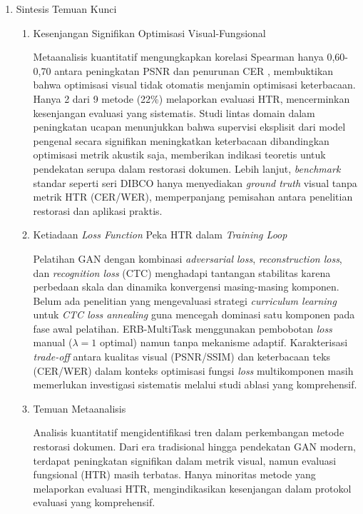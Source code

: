 \documentclass[12pt,a4paper]{article}
\begin{document}
\begin{enumerate}[leftmargin=*, labelindent=0pt, itemsep=1ex, topsep=0pt]

\item Sintesis Temuan Kunci

\begin{enumerate}[leftmargin=1.5em, labelsep=0.5em, itemindent=0pt, label=\alph*., topsep=0pt, parsep=0pt, itemsep=0pt]
      \item Kesenjangan Signifikan Optimisasi Visual-Fungsional

            Metaanalisis kuantitatif mengungkapkan korelasi Spearman hanya 0,60-0,70 antara peningkatan PSNR dan penurunan CER \parencite{jadhav2022}, membuktikan bahwa optimisasi visual tidak otomatis menjamin optimisasi keterbacaan. Hanya 2 dari 9 metode (22\%) melaporkan evaluasi HTR, mencerminkan kesenjangan evaluasi yang sistematis. Studi lintas domain dalam peningkatan ucapan \parencite{weninger2023} menunjukkan bahwa supervisi eksplisit dari model pengenal secara signifikan meningkatkan keterbacaan dibandingkan optimisasi metrik akustik saja, memberikan indikasi teoretis untuk pendekatan serupa dalam restorasi dokumen. Lebih lanjut, \textit{benchmark} standar seperti seri DIBCO hanya menyediakan \textit{ground truth} visual tanpa metrik HTR (CER/WER), memperpanjang pemisahan antara penelitian restorasi dan aplikasi praktis.

      \item Ketiadaan \textit{Loss Function} Peka HTR dalam \textit{Training Loop}


            Pelatihan GAN dengan kombinasi \textit{adversarial loss}, \textit{reconstruction loss}, dan \textit{recognition loss} (CTC) menghadapi tantangan stabilitas karena perbedaan skala dan dinamika konvergensi masing-masing komponen. Belum ada penelitian yang mengevaluasi strategi \textit{curriculum learning} untuk \textit{CTC loss annealing} guna mencegah dominasi satu komponen pada fase awal pelatihan. ERB-MultiTask menggunakan pembobotan \textit{loss} manual ($\lambda=1$ optimal) namun tanpa mekanisme adaptif. Karakterisasi \textit{trade-off} antara kualitas visual (PSNR/SSIM) dan keterbacaan teks (CER/WER) dalam konteks optimisasi fungsi \textit{loss} multikomponen masih memerlukan investigasi sistematis melalui studi ablasi yang komprehensif.

      \item Temuan Metaanalisis

            Analisis kuantitatif mengidentifikasi tren dalam perkembangan metode restorasi dokumen. Dari era tradisional hingga pendekatan GAN modern, terdapat peningkatan signifikan dalam metrik visual, namun evaluasi fungsional (HTR) masih terbatas. Hanya minoritas metode yang melaporkan evaluasi HTR, mengindikasikan kesenjangan dalam protokol evaluasi yang komprehensif.
\end{enumerate}


\end{enumerate}
\end{document}
